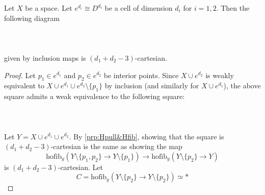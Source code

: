 \begin{prp}\label{prp:Setup} Let $X$ be a space. Let $e^{d_i}\cong D^{d_i}$ be a cell of dimension $d_i$ for $i=1,2$. Then the following diagram  
 \\~\\  \\~\\
given by inclusion maps is $(d_1+d_2-3)$-cartesian. 
\begin{proof}
Let $p_1\in e^{d_1}$ and $p_2\in e^{d_2}$ be interior points. Since $X\cup e^{d_2}$ is weakly equivalent to $X\cup e^{d_1}\cup e^{d_2}\setminus\{p_1\}$ by inclusion (and similarly for $X\cup e^{d_1}$), the above square admits a weak equivalence to the following square:  
 \\~\\  \\~\\
Let $Y=X\cup e^{d_1}\cup e^{d_2}$. By \ref{prp:Hpull&Hfib}, showing that the square is $(d_1+d_2-3)$-cartesian is the same as showing the map $$\text{hofib}_y(Y\setminus\{p_1,p_2\}\to Y\setminus\{p_1\})\to\text{hofib}_y(Y\setminus\{p_2\}\to Y)$$ is $(d_1+d_2-3)$-cartesian. Let $$C=\text{hofib}_y(Y\setminus\{p_2\}\to Y\setminus\{p_2\})\simeq\ast$$ 


\end{proof}
\end{prp}
